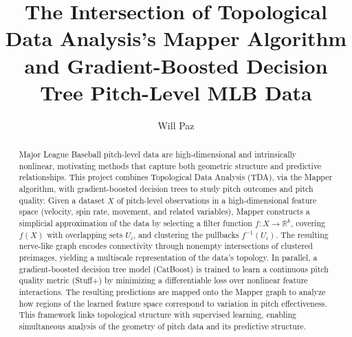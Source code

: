 \documentclass{article}
\begin{document}

\title{The Intersection of Topological Data Analysis’s Mapper Algorithm and Gradient-Boosted Decision Tree Pitch-Level MLB Data} %
\author{Will Paz} %

\maketitle

%
%

\begin{abstract}
Major League Baseball pitch-level data are high-dimensional and intrinsically nonlinear, motivating methods that capture both geometric structure and predictive relationships. This project combines Topological Data Analysis (TDA), via the Mapper algorithm, with gradient-boosted decision trees to study pitch outcomes and pitch quality. Given a dataset $X$ of pitch-level observations in a high-dimensional feature space (velocity, spin rate, movement, and related variables), Mapper constructs a simplicial approximation of the data by selecting a filter function $f : X \to \mathbb{R}^k$, covering $f(X)$ with overlapping sets ${U_i}$, and clustering the pullbacks $f^{-1}(U_i)$. The resulting nerve-like graph encodes connectivity through nonempty intersections of clustered preimages, yielding a multiscale representation of the data’s topology. In parallel, a gradient-boosted decision tree model (CatBoost) is trained to learn a continuous pitch quality metric (Stuff+) by minimizing a differentiable loss over nonlinear feature interactions. The resulting predictions are mapped onto the Mapper graph to analyze how regions of the learned feature space correspond to variation in pitch effectiveness. This framework links topological structure with supervised learning, enabling simultaneous analysis of the geometry of pitch data and its predictive structure.

\end{abstract}
\end{document}
